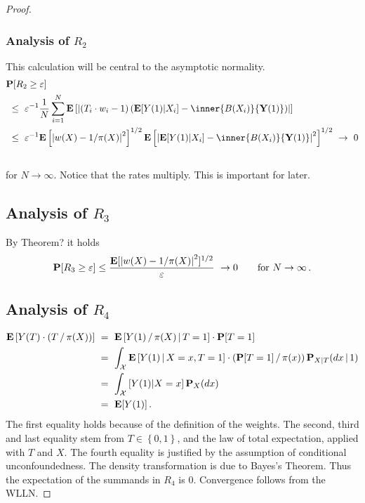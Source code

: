 \begin{proof}
  \subsubsection*{Analysis of $R_2$}
This calculation will be central to the asymptotic normality.
\begin{align*}
  &
  \P[R_2\ge \varepsilon]
  \\
  &
  \ 
  \le
  \ 
  \varepsilon^{-1}
  \frac{1}{N}\sum_{i=1}^{N} 
  \E
  \left[ 
\left| 
    \left( T_i\cdot w_i -1 \right)
    \left( 
    \E[Y(1)| X_i]
    -
    \inner
    {B(X_i)}
    { \mathbf{Y}(1) }
    \right)
\right|
  \right]
  \\
  &
  \ 
  \le
  \ 
  \varepsilon^{-1}
  \E
  \left[ 
\left| 
    w(X) - 1/\pi(X)
\right|
^2
  \right]
  ^{1/2}
  \E
  \left[ 
\left| 
    \E[Y(1)| X_i]
    -
    \inner
    {B(X_i)}
    { \mathbf{Y}(1) }
\right|
^2
  \right]
  ^{1/2}
  \ 
  \to
  \ 
  0
  \\
  &
\end{align*}
for $N\to\infty$. 
Notice that the rates multiply. This is important for later.
\subsection*{Analysis of $R_3$}
By Theorem?
it holds
\begin{gather*}
  \P[R_3\ge \varepsilon]\le
  \frac{\E[\left| w(X) - 1/\pi(X)\right|^2]^{1/2}}{\varepsilon}
  \ 
  \to
  0
  \qquad
  \text{for}\ 
  N
  \to
  \infty
  \,.
\end{gather*}
\subsection*{Analysis of $R_4$}
\begin{align}
  \begin{split}
  \E
  \left[ 
    Y(T)
    \cdot
    (T\,/\,\pi(X))
  \right]
  &\ =\ 
  \E
  \left[ 
    Y(1)
    \,
    /
    \,
    \pi(X)
    \,
    \vert
    \,
    T=1
  \right]
  \cdot
  \P[T=1]
  \\
  &\ =\ 
  \int_\mathcal{X}
  \E
  \left[ 
    Y(1)
    \,
    \vert
    \,
    X=x
    ,
    T=1
  \right]
  \cdot
  (
  \P[T=1]
  \,
  /
  \,
  \pi(x)
  )
  \,
  \P_{X|T}(dx\,|\,1)
  \\
  &\ =\ 
  \int_\mathcal{X}
  \left[ 
    Y(1)
    \vert
    X=x
  \right]
  \P_X(dx)
  \\
  &
 \  
  =
  \ 
  \E[Y(1)]
  \,.
\end{split}
\end{align}
The first equality holds because of the definition of the weights.
The second, third and last equality stem from 
$
  T\in \left\{ 0,1 \right\}
$,
and the law of total expectation, applied with $T$ and $X$.
The fourth equality is justified by the assumption of conditional unconfoundedness.
The density transformation is due to Bayes's Theorem.
Thus the expectation of the summands in $R_4$ is 0.
Convergence follows from the WLLN.

\end{proof}
